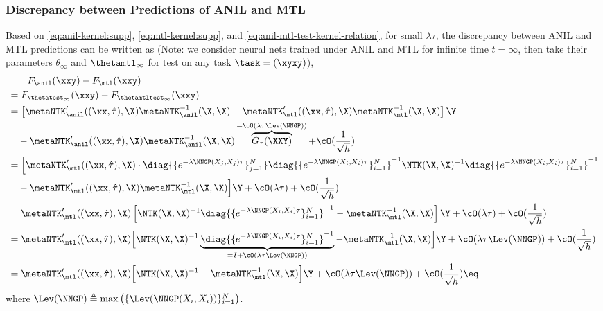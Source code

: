 \documentclass{article}
\begin{document}
\subsubsection{Discrepancy between Predictions of ANIL and MTL}\label{supp:proof:pred-diff}
Based on \eqref{eq:anil-kernel:supp}, \eqref{eq:mtl-kernel:supp}, and \eqref{eq:anil-mtl-test-kernel-relation}, for small $\lambda \tau$, the discrepancy between ANIL and MTL predictions can be written as (Note: we consider neural nets trained under ANIL and MTL for infinite time $t=\infty$, then take their parameters $\theta_\infty$ and $\thetamtl_\infty$ for test on any task $\task=(\xyxy)$),
\begin{align*}
    & \qquad F_\anil(\xxy) - F_\mtl(\xxy) \\
    &= F_{\thetatest_{\infty}}(\xxy) - F_{\thetamtltest_{\infty}}(\xxy)\\
    &= \left[ \metaNTK_\anil'((\xx,\hat\tau),\X) \metaNTK_\anil^{-1}(\X,\X)-\metaNTK_\mtl'((\xx,\hat\tau),\X) \metaNTK_\mtl^{-1}(\X,\X) \right]\Y \\
    &\quad - \metaNTK_\anil'((\xx,\hat\tau),\X) \metaNTK_\anil^{-1}(\X,\X)\overbrace{G_\tau(\XXY)}^{ = \cO(\lambda \tau \Lev(\NNGP)) } +\cO(\frac{1}{\sqrt h})\\
    &= \Big[\metaNTK_\mtl'((\xx,\hat\tau),\X) \cdot \diag{\{e^{-\lambda \NNGP(X_j,X_j)\tau}\}_{j=1}^N} \diag{\{e^{-\lambda \NNGP(X_i,X_i)\tau}\}_{i=1}^N}^{-1}\NTK(\X,\X)^{-1} \diag{\{e^{-\lambda \NNGP(X_i,X_i)\tau}\}_{i=1}^N}^{-1} \\
    & \quad - \metaNTK_\mtl'((\xx,\hat\tau),\X) \metaNTK_\mtl^{-1}(\X,\X)\Big]\Y + \cO(\lambda \tau)+\cO(\frac{1}{\sqrt h})\\
    &=\metaNTK_\mtl'((\xx,\hat\tau),\X)\left[\NTK(\X,\X)^{-1} \diag{\{e^{-\lambda \NNGP(X_i,X_i)\tau}\}_{i=1}^N}^{-1} - \metaNTK_\mtl^{-1}(\X,\X)\right]\Y + \cO(\lambda \tau)+\cO(\frac{1}{\sqrt h})\\
    &= \metaNTK_\mtl'((\xx,\hat\tau),\X)\Big[\NTK(\X,\X)^{-1} \underbrace{\diag{\{e^{-\lambda \NNGP(X_i,X_i)\tau}\}_{i=1}^N}^{-1}}_{= I + \cO(\lambda \tau \Lev(\NNGP))} - \metaNTK_\mtl^{-1}(\X,\X)\Big]\Y + \cO(\lambda \tau \Lev(\NNGP))+\cO(\frac{1}{\sqrt h})\\
    &= \metaNTK_\mtl'((\xx,\hat\tau),\X)\Big[\NTK(\X,\X)^{-1} - \metaNTK_\mtl^{-1}(\X,\X)\Big]\Y + \cO(\lambda \tau \Lev(\NNGP))+\cO(\frac{1}{\sqrt h})\eq\label{eq:anil-mtl-diff:general}
\end{align*}
where $\Lev(\NNGP)\triangleq \max\left(\{\Lev(\NNGP(X_i,X_i))\}_{i=1}^N\right)$.
\end{document}

